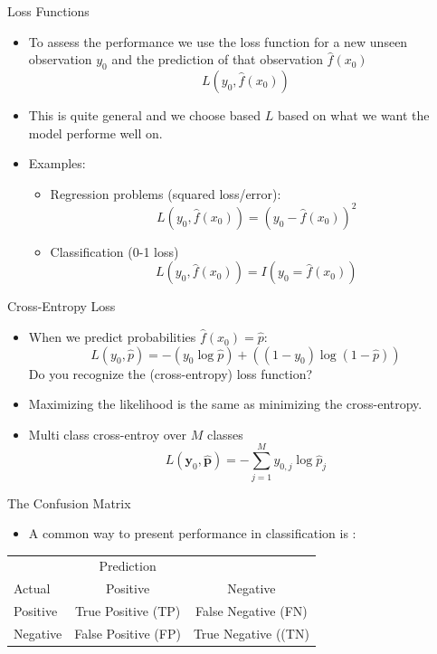 \documentclass[10pt,handout]{beamer}
\begin{document}
\begin{frame}{Loss Functions}



\begin{itemize}

\item To assess the performance we use the loss function for a new unseen observation $y_0$ and the prediction of that observation $\hat{f}(x_0)$
\[
L(y_0,\hat{f}(x_0))
\]
\pause
\item This is quite general and we choose based $L$ based on what we want the model performe well on.\pause
\item Examples:
\begin{itemize}
\item Regression problems (squared loss/error):
\[
    L(y_0,\hat{f}(x_0)) = (y_0 - \hat{f}(x_0))^2
\]
\pause
\item Classification (0-1 loss)
\[
    L(y_0,\hat{f}(x_0)) = I(y_0 = \hat{f}(x_0))
\]
\end{itemize}


\end{itemize}

\end{frame}


\begin{frame}{Cross-Entropy Loss}

\begin{itemize}
\item When we predict probabilities $\hat{f}(x_0)=\hat{p}$:
\[
L(y_0, \hat{p}) = - (y_0 \log{\hat{p}}) + ((1 - y_0) \log{(1- \hat{p})})
\]
 Do you recognize the (cross-entropy) loss function?
\pause
\item Maximizing the likelihood is the same as minimizing the cross-entropy. \pause
\item Multi class cross-entroy over $M$ classes
\[
L(\mathbf{y}_0, \hat{\mathbf{p}}) = - \sum^M_{j=1} y_{0,j} \log{\hat{p}_j}
\]
\end{itemize}

\end{frame}


\begin{frame}{The Confusion Matrix}

\begin{itemize}
\item A common way to present performance in classification is :
\end{itemize}
\centering
\begin{tabular}{lcc}
  & Prediction &  \\
  Actual & Positive & Negative \\
  Positive & True Positive (TP) & False Negative (FN) \\
  Negative & False Positive (FP) & True Negative ((TN)
\end{tabular}


\end{frame}
\end{document}
